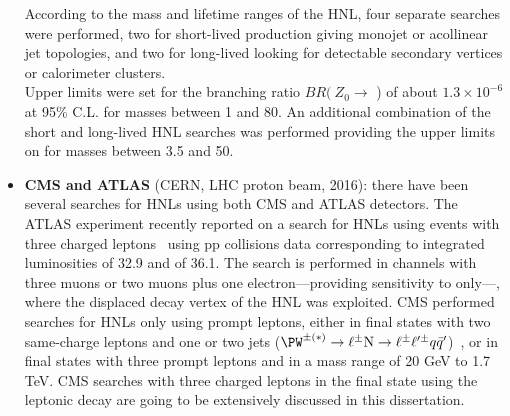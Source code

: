 \begin{itemize}
  According to the mass and lifetime ranges of the HNL, four separate searches were performed, two for short-lived \hnl production giving monojet or acollinear jet topologies, 
  and two for long-lived \hnl looking for detectable secondary vertices or calorimeter clusters.\\
 Upper limits were set for the branching ratio $BR (\: Z_0\rightarrow$ \hnl) of
 about $1.3 \times 10^{-6}$ at 95\% C.L. for \hnl masses between 1 and
 80\GeV. An additional combination of the short and long-lived HNL searches was performed providing the upper limits on \mixpar for \hnl masses between 3.5 and
 50\GeV. 
\item \textbf{CMS and ATLAS} (CERN, LHC proton beam, 2016): there have
  been several searches for HNLs using both CMS and ATLAS detectors.
The ATLAS experiment recently reported on a search for HNLs using events with three charged leptons~\cite{atlasintro2} using 
pp collisions data corresponding to integrated luminosities of 32.9
and of
36.1\fbinv. 
The search is performed in channels with three muons or two muons plus
one electron---providing sensitivity  to \mixparm only---, where the 
displaced decay vertex of the HNL was exploited.
CMS performed searches for HNLs only using prompt leptons,
either in final states with two same-charge leptons and one or two jets
(\(\PW^{\pm(\ast)}\to\ell^{\pm}\hnl\to\ell^{\pm}\ell^{\prime\pm}q\bar{q}^{\prime}\))~\cite{Sirunyan:2018xiv},
or in final states with three prompt leptons and \ptmiss 
in a mass range of 20 GeV to 1.7 TeV.
CMS searches with three charged leptons in the final state using the leptonic \PW decay are going to be extensively discussed in this
dissertation.
\end{itemize}

